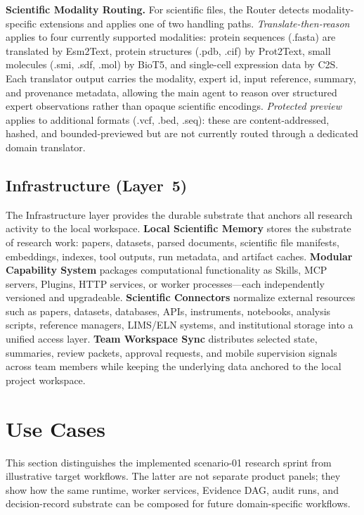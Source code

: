 \documentclass[sn-basic,Numbered,pdflatex]{sn-jnl}
\begin{document}
\textbf{Scientific Modality Routing.} For scientific files, the Router detects modality-specific extensions and applies one of two handling paths. \emph{Translate-then-reason} applies to four currently supported modalities: protein sequences (.fasta) are translated by Esm2Text, protein structures (.pdb, .cif) by Prot2Text, small molecules (.smi, .sdf, .mol) by BioT5, and single-cell expression data by C2S. Each translator output carries the modality, expert id, input reference, summary, and provenance metadata, allowing the main agent to reason over structured expert observations rather than opaque scientific encodings. \emph{Protected preview} applies to additional formats (.vcf, .bed, .seq): these are content-addressed, hashed, and bounded-previewed but are not currently routed through a dedicated domain translator.

\subsection{Infrastructure (Layer~5)}
The Infrastructure layer provides the durable substrate that anchors all research activity to the local workspace. \textbf{Local Scientific Memory} stores the substrate of research work: papers, datasets, parsed documents, scientific file manifests, embeddings, indexes, tool outputs, run metadata, and artifact caches. \textbf{Modular Capability System} packages computational functionality as Skills, MCP servers, Plugins, HTTP services, or worker processes---each independently versioned and upgradeable. \textbf{Scientific Connectors} normalize external resources such as papers, datasets, databases, APIs, instruments, notebooks, analysis scripts, reference managers, LIMS/ELN systems, and institutional storage into a unified access layer. \textbf{Team Workspace Sync} distributes selected state, summaries, review packets, approval requests, and mobile supervision signals across team members while keeping the underlying data anchored to the local project workspace.

\section{Use Cases}


This section distinguishes the implemented scenario-01 research sprint from illustrative target workflows. The latter are not separate product panels; they show how the same runtime, worker services, Evidence DAG, audit runs, and decision-record substrate can be composed for future domain-specific workflows.
\end{document}
